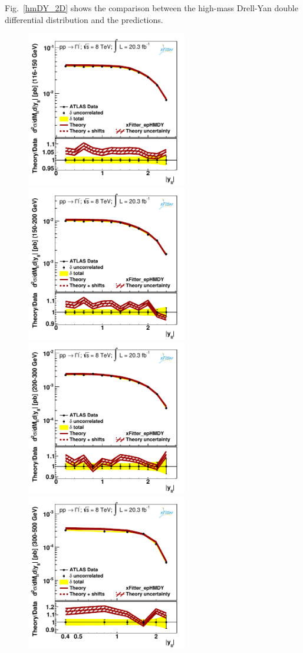 Fig.~\ref{hmDY_2D} 
shows the comparison between the high-mass Drell-Yan double differential distribution and 
the predictions.
\begin{figure}
\centering
\includegraphics[width=7cm]{plots/data_1.pdf} 
\includegraphics[width=7cm]{plots/data_2.pdf} 
\includegraphics[width=7cm]{plots/data_3.pdf} 
\includegraphics[width=7cm]{plots/data_4.pdf} 

\end{figure}
